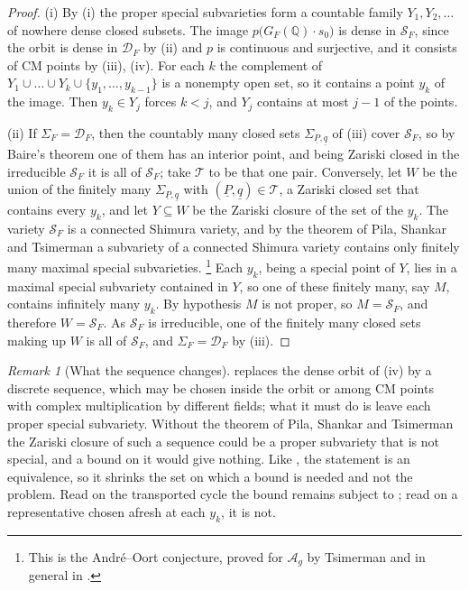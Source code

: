 \documentclass[11pt,reqno]{amsart}
\theoremstyle{plain}
\theoremstyle{definition}
\theoremstyle{remark}
\newtheorem{remark}[theorem]{Remark}
\newcommand{\QQ}{\mathbb{Q}}
\newcommand{\cA}{\mathcal{A}}
\newcommand{\cD}{\mathcal{D}}
\newcommand{\cS}{\mathcal{S}}
\begin{document}
\begin{proof}
(i) By (i) the proper special subvarieties form a
countable family $Y_{1},Y_{2},\dots$ of nowhere dense closed subsets. The
image $p\bigl(G_{F}(\QQ)\cdot s_{0}\bigr)$ is dense in $\cS_{F}$, since the
orbit is dense in $\cD_{F}$ by (ii) and $p$ is
continuous and surjective, and it consists of CM points by
(iii), (iv). For each $k$ the complement of
$Y_{1}\cup\dots\cup Y_{k}\cup\{y_{1},\dots,y_{k-1}\}$ is a nonempty open set,
so it contains a point $y_{k}$ of the image. Then $y_{k}\in Y_{j}$ forces
$k<j$, and $Y_{j}$ contains at most $j-1$ of the points.

(ii) If $\Sigma_{F}=\cD_{F}$, then the countably many closed sets
$\Sigma_{\underline{P},\underline{q}}$ of (iii) cover
$\cS_{F}$, so by Baire's theorem one of them has an interior point, and being
Zariski closed in the irreducible $\cS_{F}$ it is all of $\cS_{F}$; take
$\mathcal{T}$ to be that one pair. Conversely, let $W$ be the union of the
finitely many $\Sigma_{\underline{P},\underline{q}}$ with
$(\underline{P},\underline{q})\in\mathcal{T}$, a Zariski closed set that
contains every $y_{k}$, and let $Y\subseteq W$ be the Zariski closure of the
set of the $y_{k}$. The variety $\cS_{F}$ is a connected Shimura variety,
and by the theorem of Pila, Shankar and Tsimerman
\cite[Theorem~1.1]{PST} a subvariety of a connected Shimura variety contains
only finitely many maximal special subvarieties.%
\footnote{This is the Andr\'e--Oort conjecture, proved for $\cA_{g}$ by
Tsimerman \cite{Tsi18} and in general in \cite{PST}.}
Each $y_{k}$, being a special point of $Y$, lies in a maximal special
subvariety contained in $Y$, so one of these finitely many, say $M$,
contains infinitely many $y_{k}$. By hypothesis $M$ is not proper, so
$M=\cS_{F}$, and therefore $W=\cS_{F}$. As $\cS_{F}$ is irreducible, one of
the finitely many closed sets making up $W$ is all of $\cS_{F}$, and
$\Sigma_{F}=\cD_{F}$ by (iii).
\end{proof}

\begin{remark}[What the sequence changes]\label{rem:escape}
 replaces the dense orbit of (iv)
by a discrete sequence, which may be chosen inside the orbit or among CM
points with complex multiplication by different fields; what it must do is
leave each proper special subvariety. Without the theorem of Pila, Shankar
and Tsimerman the Zariski closure of such a sequence could be a proper
subvariety that is not special, and a bound on it would give nothing. Like
, the statement is an equivalence, so it shrinks the
set on which a bound is needed and not the problem. Read on the transported
cycle the bound remains subject to ; read on a
representative chosen afresh at each $y_{k}$, it is not.
\end{remark}
\end{document}
